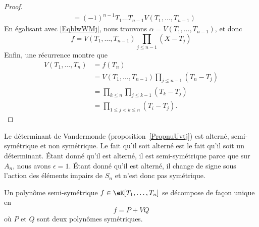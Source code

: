 \begin{proof}
\begin{subequations}
\begin{align}
             &=(-1)^{n-1}T_1\ldots T_{n-1}V(T_1,\ldots, T_{n-1})
        \end{align}
    \end{subequations}
    En égalisant avec \eqref{EqblwWMj}, nous trouvons \( \alpha=V(T_1,\ldots, T_{n-1})\), et donc
    \begin{equation}
        f=V(T_1,\ldots, T_{n-1})\prod_{j\leq n-1}(X-T_j)
    \end{equation}
    Enfin, une récurrence montre que
    \begin{subequations}
        \begin{align}
            V(T_1,\ldots, T_n)&=f(T_n)\\
            &=V(T_1,\ldots, T_{n-1})\prod_{j\leq n-1}(T_n-T_j)\\
            &=\prod_{k\leq n}\prod_{j\leq k-1}(T_k-T_j)\\
            &=\prod_{1\leq j<k\leq n}(T_i-T_j).
        \end{align}
    \end{subequations}
\end{proof}

\begin{example}
    Le déterminant de Vandermonde (proposition~\ref{PropnuUvtj}) est alterné, semi-symétrique et non symétrique. Le fait qu'il soit alterné est le fait qu'il soit un déterminant. Étant donné qu'il est alterné, il est semi-symétrique parce que sur \( A_n\), nous avons \( \epsilon=1\). Étant donné qu'il est alterné, il change de signe sous l'action des éléments impairs de \( S_n\) et n'est donc pas symétrique.
\end{example}

\begin{proposition} \label{PropUDqXax}
    Un polynôme semi-symétrique \( f\in \eK[T_1,\ldots, T_n]\) se décompose de façon unique en
    \begin{equation}
        f=P+VQ
    \end{equation}
    où \( P\) et \( Q\) sont deux polynômes symétriques.
\end{proposition}

